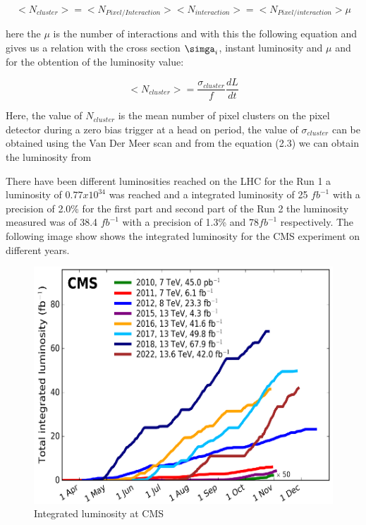 \begin{equation}
<N_{cluster}> = <N_{Pixel/Interaction}> <N_{interaction}> = <N_{Pixel/interaction}> \mu 
\end{equation}

here the $\mu$ is the number of interactions and with this the following equation and gives us a relation with the cross section $\simga_{i}$, instant luminosity and $\mu$ and for the obtention of the luminosity value:

\begin{equation}
<N_{cluster}> = \frac{\sigma_{cluster}}{f} \frac{dL}{dt}
\end{equation}

Here, the value of $N_{cluster}$ is the mean number of pixel clusters on the pixel detector during a zero bias trigger at a head on period, the value of $\sigma_{cluster}$ can be obtained using the Van Der Meer scan and from the equation (2.3) we can obtain the luminosity from \cite{PCC2}


There have been different luminosities reached on the LHC for the Run 1 a luminosity of $0.77 x 10^{34}$ was reached and a integrated luminosity of 25 $fb^{-1}$  with a precision of 2.0\% for the first part and second part of the Run 2 the luminosity measured was of 38.4 $fb^{-1}$ with a precision of 1.3\% and 78$fb^{-1}$ respectively\cite{LHClum}.  The following image show shows the integrated luminosity for the CMS experiment on different years.  

\begin{figure}[h]
    \centering
     \includegraphics[scale=1.25]{integratedlum.png}
     \caption{Integrated luminosity at CMS}
    \label{fig:CMS-Luminosity}
\end{figure}

